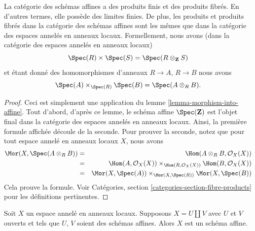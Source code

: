 \begin{lemma}
\label{lemma-fibre-product-affine-schemes}
La catégorie des schémas affines a des produits finis et des produits fibrés. En d'autres
termes, elle possède des limites finies. De plus, les produits et
produits fibrés dans la catégorie des schémas affines sont les mêmes
que dans la catégorie des espaces annelés en anneaux locaux.
Formellement, nous avons (dans la catégorie des espaces annelés en anneaux locaux)
$$
\Spec(R) \times \Spec(S) =
\Spec(R \otimes_{\mathbf{Z}} S)
$$
et étant donné des homomorphismes d'anneaux $R \to A$, $R \to B$ nous avons
$$
\Spec(A) \times_{\Spec(R)} \Spec(B) =
\Spec(A
\otimes_R B).
$$
\end{lemma}

\begin{proof}
Ceci est simplement une application du lemme \ref{lemma-morphism-into-affine}. Tout
d'abord, d'après ce lemme, le schéma affine
$\Spec(\mathbf{Z})$ est l'objet final dans la catégorie des espaces
annelés en anneaux locaux. Ainsi, la première formule affichée découle
de la seconde. Pour prouver la seconde, notez que pour tout
espace annelé en anneaux locaux $X$, nous avons
\begin{eqnarray*}
\Mor(X, \Spec(A \otimes_R B)) &
= &
\Hom(A \otimes_R B, \mathcal{O}_X(X)) \\ &
= &
\Hom(A, \mathcal{O}_X(X))
\times_{\Hom(R, \mathcal{O}_X(X))}
\Hom(B, \mathcal{O}_X(X)) \\ &
= &
\Mor(X, \Spec(A))
\times_{\Mor(X, \Spec(R))}
\Mor(X, \Spec(B))
\end{eqnarray*}
Cela prouve la formule. Voir
Catégories, section \ref{categories-section-fibre-products} pour les
définitions pertinentes.
\end{proof}

\begin{lemma}
\label{lemma-disjoint-union-affines}
Soit $X$ un espace annelé en anneaux
locaux. Supposons $X = U \amalg V$ avec $U$ et $V$ ouverts et
tels que $U$, $V$ soient des schémas affines. Alors $X$ est un schéma affine.
\end{lemma}

